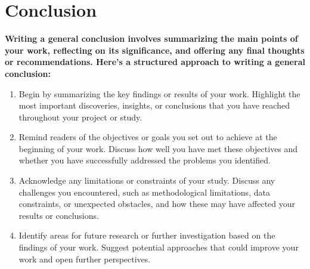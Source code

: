\chapter*{Conclusion}
\textbf{Writing a general conclusion involves summarizing the main points of your work, reflecting on its significance, and offering any final thoughts or recommendations. Here's a structured approach to writing a general conclusion:}

\begin{enumerate}
    \item  Begin by summarizing the key findings or results of your work. Highlight the most important discoveries, insights, or conclusions that you have reached throughout your project or study.

    \item Remind readers of the objectives or goals you set out to achieve at the beginning of your work. Discuss how well you have met these objectives and whether you have successfully addressed the problems you identified.
    \item  Acknowledge any limitations or constraints of your study. Discuss any challenges you encountered, such as methodological limitations, data constraints, or unexpected obstacles, and how these may have affected your results or conclusions.
    
     \item Identify areas for future research or further investigation based on the findings of your work. Suggest potential approaches that could improve your work and open further perspectives.

\end{enumerate}